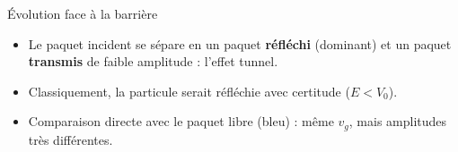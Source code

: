 \documentclass[10pt,aspectratio=169]{beamer}
\begin{document}
\begin{frame}{Évolution face à la barrière}
	\vspace{-1em} %
	
	{\centering
		\par}
	
	\vspace{0.5em} %
	\begin{itemize}
		\item Le paquet incident se sépare en un paquet \textbf{réfléchi} (dominant)
		et un paquet \textbf{transmis} de faible amplitude : l'effet tunnel.
		\item Classiquement, la particule serait réfléchie avec certitude ($E < V_0$).
		\item Comparaison directe avec le paquet libre (bleu) : même $v_g$,
		mais amplitudes très différentes.
	\end{itemize}
\end{frame}
\end{document}
